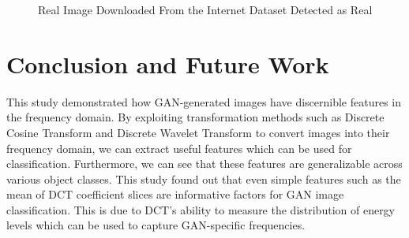\documentclass[journal]{./IEEE/IEEEtran}
\begin{document}
\begin{figure}
    \centering
    \hfil
    \hfil
    \caption{Real Image Downloaded From the Internet Dataset Detected as Real}
    \label{fig:mainfig}
\end{figure}

\section{Conclusion and Future Work}
This study demonstrated how GAN-generated images have discernible features in the frequency domain. By exploiting transformation methods such as Discrete Cosine Transform and Discrete Wavelet Transform to convert images into their frequency domain, we can extract useful features which can be used for classification. Furthermore, we can see that these features are generalizable across various object classes. This study found out that even simple features such as the mean of DCT coefficient slices are informative factors for GAN image classification. This is due to DCT's ability to measure the distribution of energy levels which can be used to capture GAN-specific frequencies.  
\end{document}
